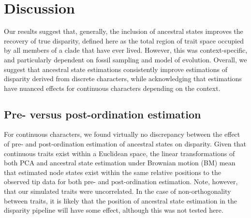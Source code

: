 \documentclass[11pt, a4paper]{article}
\newcommand{\ase}{ancestral state estimation }
\begin{document}
\section{Discussion}
Our results suggest that, generally, the inclusion of ancestral states improves the recovery of true disparity, defined here as the total region of trait space occupied by all members of a clade that have ever lived.
However, this was context-specific, and particularly dependent on fossil sampling and model of evolution.
Overall, we suggest that ancestral state estimations consistently improve estimations of disparity derived from discrete characters, while acknowledging that estimations have nuanced effects for continuous characters depending on the context.

\subsection{Pre- versus post-ordination estimation}
For continuous characters, we found virtually no discrepancy between the effect of pre- and post-ordination estimation of ancestral states on disparity.
Given that continuous traits exist within a Euclidean space, the linear transformations of both PCA and \ase under Brownian motion (BM) mean that estimated node states exist within the same relative positions to the observed tip data for both pre- and post-ordination estimation. 
Note, however, that our simulated traits were uncorrelated.
In the case of non-orthogonality between traits, it is likely that the position of \ase in the disparity pipeline will have some effect, although this was not tested here.
\end{document}
